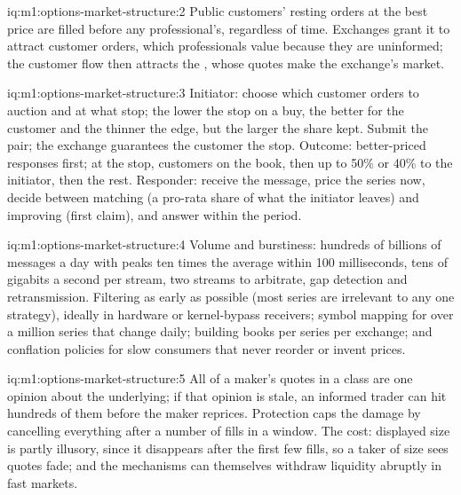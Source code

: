 \begin{solution}{iq:m1:options-market-structure:2}
Public customers' resting orders at the best price are filled before any
professional's, regardless of time. Exchanges grant it to attract customer
orders, which professionals value because they are uninformed; the customer
flow then attracts the , whose quotes make the exchange's
market.
\end{solution}

\begin{solution}{iq:m1:options-market-structure:3}
Initiator: choose which customer orders to auction and at what stop; the
lower the stop on a buy, the better for the customer and the thinner the
edge, but the larger the share kept. Submit the pair; the exchange guarantees
the customer the stop. Outcome: better-priced responses first; at the stop,
customers on the book, then up to 50\% or 40\% to the initiator, then the
rest. Responder: receive the message, price the series now, decide between
matching (a pro-rata share of what the initiator leaves) and improving (first
claim), and answer within the period.
\end{solution}

\begin{solution}{iq:m1:options-market-structure:4}
Volume and burstiness: hundreds of billions of messages a day with peaks ten
times the average within 100 milliseconds, tens of gigabits a second per
stream, two streams to arbitrate, gap detection and retransmission. Filtering
as early as possible (most series are irrelevant to any one strategy),
ideally in hardware or kernel-bypass receivers; symbol mapping for over a
million series that change daily; building books per series per exchange;
and conflation policies for slow consumers that never reorder or invent
prices.
\end{solution}

\begin{solution}{iq:m1:options-market-structure:5}
All of a maker's quotes in a class are one opinion about the underlying; if
that opinion is stale, an informed trader can hit hundreds of them before
the maker reprices. Protection caps the damage by cancelling everything after
a number of fills in a window. The cost: displayed size is partly illusory,
since it disappears after the first few fills, so a taker of size sees
quotes fade; and the mechanisms can themselves withdraw liquidity abruptly
in fast markets.
\end{solution}

